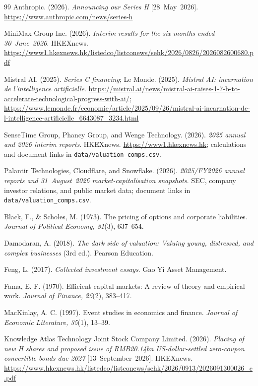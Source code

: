 \documentclass[11pt]{article}
\begin{document}
\begin{thebibliography}{99}
Anthropic. (2026). \emph{Announcing our Series H} [28~May~2026].
\url{https://www.anthropic.com/news/series-h}

MiniMax Group Inc. (2026). \emph{Interim results for the six months ended 30~June~2026}.
HKEXnews. \url{https://www1.hkexnews.hk/listedco/listconews/sehk/2026/0826/2026082600680.pdf}

Mistral AI. (2025). \emph{Series C financing}; Le Monde. (2025). \emph{Mistral AI: incarnation de
l'intelligence artificielle}. \url{https://mistral.ai/news/mistral-ai-raises-1-7-b-to-accelerate-technological-progress-with-ai/};
\url{https://www.lemonde.fr/economie/article/2025/09/26/mistral-ai-incarnation-de-l-intelligence-artificielle_6643087_3234.html}

SenseTime Group, Phancy Group, and Wenge Technology. (2026). \emph{2025 annual and 2026 interim reports}.
HKEXnews. \url{https://www1.hkexnews.hk}; calculations and document links in
\texttt{data/valuation\_comps.csv}.

Palantir Technologies, Cloudflare, and Snowflake. (2026). \emph{2025/FY2026 annual reports and
31~August~2026 market-capitalisation snapshots}. SEC, company investor relations, and public market data;
document links in \texttt{data/valuation\_comps.csv}.

Black, F., \& Scholes, M. (1973). The pricing of options and corporate liabilities. \emph{Journal of
Political Economy, 81}(3), 637--654.

Damodaran, A. (2018). \emph{The dark side of valuation: Valuing young, distressed, and complex businesses}
(3rd ed.). Pearson Education.

Feng, L. (2017). \emph{Collected investment essays}. Gao Yi Asset Management.

Fama, E. F. (1970). Efficient capital markets: A review of theory and empirical work. \emph{Journal of
Finance, 25}(2), 383--417.

MacKinlay, A. C. (1997). Event studies in economics and finance. \emph{Journal of Economic Literature,
35}(1), 13--39.

Knowledge Atlas Technology Joint Stock Company Limited. (2026). \emph{Placing of new H shares and
proposed issue of RMB20.14bn US-dollar-settled zero-coupon convertible bonds due 2027}
[13~September~2026]. HKEXnews.
\url{https://www.hkexnews.hk/listedco/listconews/sehk/2026/0913/2026091300026_c.pdf}


\end{thebibliography}
\end{document}
